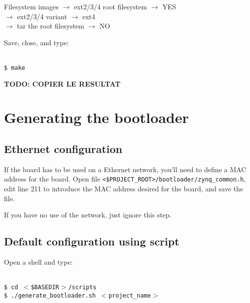 \documentclass[openany,a4paper]{book}
\begin{document}
\begin{tabbing}
\> Filesystem images                  \> $\rightarrow$ ext2/3/4 root filesystem                      \>                                                          \> $\rightarrow$ YES \\
\>                                    \>                                                             \>                                                          \> $\rightarrow$ ext2/3/4 variant                           \> $\rightarrow$ ext4 \\
\>                                    \> $\rightarrow$ tar the root filesystem                       \>                                                          \> $\rightarrow$ NO \\
\end{tabbing}

Save, close, and type:

\begin{tabbing}
\kill \hspace{1cm} \= \\
\> \texttt{\$ make}\\
\end{tabbing}

\textbf{ TODO: COPIER LE RESULTAT}

\section{Generating the bootloader}


\subsection{Ethernet configuration}

If the board has to be used on a Ethernet network, you'll need to define a MAC address for the board.
Open file \nolinkurl{<$PROJECT_ROOT>/bootloader/zynq_common.h}, edit line 211 to introduce the MAC address desired for the board, and save the file.

If you have no use of the network, just ignore this step.

\subsection{Default configuration using script}

Open a shell and type:
\begin{tabbing}
\kill \hspace{1cm} \= \\
\> \texttt{\$ cd $<$\$BASEDIR$>$/scripts} \\
\> \texttt{\$ ./generate\_bootloader.sh $<$project\_name$>$}\\
\end{tabbing}
\end{document}
